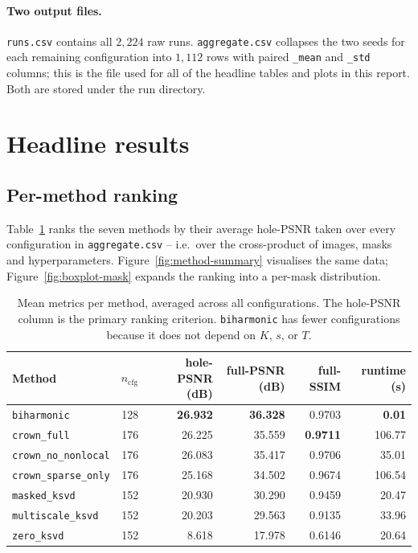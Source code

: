 \documentclass[11pt,a4paper]{article}
\newcommand{\method}[1]{\texttt{#1}}
\begin{document}
\paragraph{Two output files.}
\texttt{runs.csv} contains all $2{,}224$ raw runs. \texttt{aggregate.csv}
collapses the two seeds for each remaining configuration into
$1{,}112$ rows with paired \texttt{\_mean} and \texttt{\_std}
columns; this is the file used for all of the headline tables and
plots in this report. Both are stored under the run directory.

\section{Headline results}\label{sec:headline}

\subsection{Per-method ranking}

Table~\ref{tab:headline} ranks the seven methods by their
average hole-PSNR taken over every configuration in
\texttt{aggregate.csv} -- i.e.\ over the cross-product of
images, masks and hyperparameters. Figure~\ref{fig:method-summary}
visualises the same data; Figure~\ref{fig:boxplot-mask} expands the
ranking into a per-mask distribution.

\begin{table}[h]
\centering\small
\begin{tabular}{lrrrrr}
\toprule
Method & $n_{\text{cfg}}$ & hole-PSNR (dB) & full-PSNR (dB) & full-SSIM & runtime (s) \\
\midrule
\method{biharmonic}        & 128 & \textbf{26.932} & \textbf{36.328} & 0.9703 & \textbf{0.01} \\
\method{crown\_full}        & 176 & 26.225 & 35.559 & \textbf{0.9711} & 106.77 \\
\method{crown\_no\_nonlocal}& 176 & 26.083 & 35.417 & 0.9706 & 35.01 \\
\method{crown\_sparse\_only}& 176 & 25.168 & 34.502 & 0.9674 & 106.54 \\
\method{masked\_ksvd}       & 152 & 20.930 & 30.290 & 0.9459 & 20.47 \\
\method{multiscale\_ksvd}   & 152 & 20.203 & 29.563 & 0.9135 & 33.96 \\
\method{zero\_ksvd}         & 152 &  8.618 & 17.978 & 0.6146 & 20.64 \\
\bottomrule
\end{tabular}
\caption{Mean metrics per method, averaged across all
configurations. The hole-PSNR column is the primary ranking
criterion. \method{biharmonic} has fewer configurations because
it does not depend on $K$, $s$, or $T$.}
\label{tab:headline}
\end{table}
\end{document}
